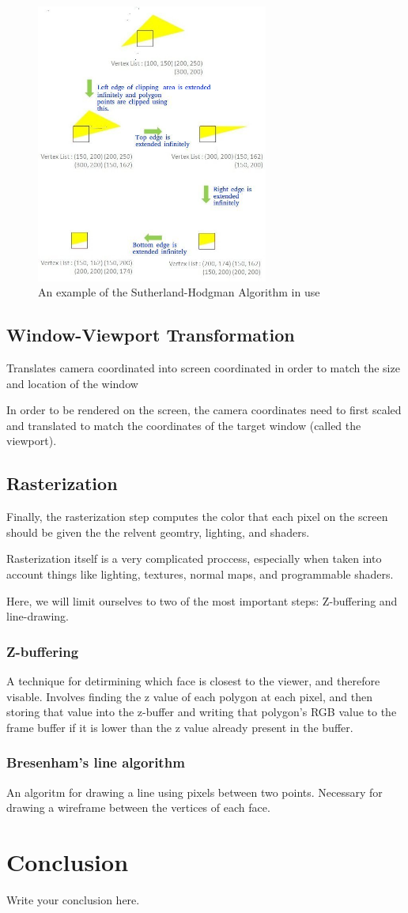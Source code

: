 \documentclass{article}
\begin{document}
\begin{figure}
    \centering
    \includegraphics[width=3.0in]{Sutherland-Hodgman-Example.jpg}
    \caption{An example of the Sutherland-Hodgman Algorithm in use}
    \label{Sutherland-Hodgman}
\end{figure}

\subsection{Window-Viewport Transformation}
Translates camera coordinated into screen coordinated in order to match the size and location of the window

In order to be rendered on the screen, the camera coordinates need to first scaled and translated to match the coordinates of the target window (called the viewport).

\subsection{Rasterization}
Finally, the rasterization step computes the color that each pixel on the screen should be given the the relvent geomtry, lighting, and shaders.

Rasterization itself is a very complicated proccess, especially when taken into account things like lighting, textures, normal maps, and programmable shaders.

Here, we will limit ourselves to two of the most important steps: Z-buffering and line-drawing.

\subsubsection{Z-buffering}
A technique for detirmining which face is closest to the viewer, and therefore visable. Involves finding the z value of each polygon at each pixel, and then storing that value into the z-buffer and writing that polygon's RGB value to the frame buffer if it is lower than the z value already present in the buffer.

\subsubsection{Bresenham's line algorithm}
An algoritm for drawing a line using pixels between two points. Necessary for drawing a wireframe between the vertices of each face.

\section{Conclusion}
Write your conclusion here.
\end{document}
